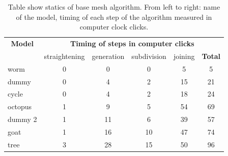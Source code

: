 \begin{table}[h]
\centering
\begin{tabular}{l|cccc||c}\hline
\multicolumn{1}{c}{\textbf{Model}} & \multicolumn{5}{c}{\textbf{Timing of steps in computer clicks}} \\
   & straightening & generation & subdivision & joining & \textbf{Total} \\ \hline
  worm & 0 & 0 & 0 & 5 & 5 \\
  dummy & 0 & 4 & 2 & 15 & 21 \\
  cycle & 0 & 4 & 2 & 18 & 24 \\
  octopus & 1 & 9 & 5 & 54 & 69 \\
  dummy 2 & 1 & 11 & 6 & 39 & 57 \\
  goat & 1 & 16 & 10 & 47 & 74 \\
  tree & 3 & 28 & 15 & 50 & 96 \\ \hline
\end{tabular}
\caption[Table show statics of base mesh algorithm]{Table show statics of base mesh algorithm. From left to right: name of the model, timing of each step of the algorithm measured in computer clock clicks.}
\label{tab:results}
\end{table}
